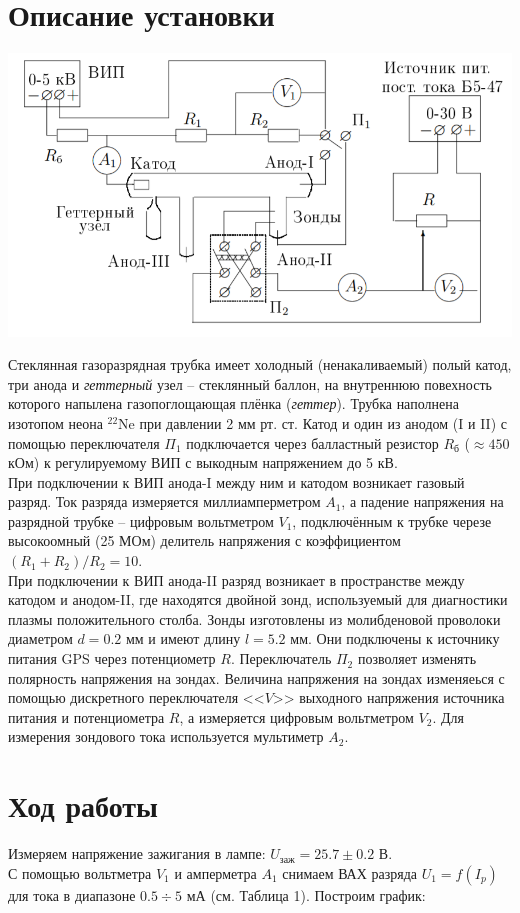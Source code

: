\documentclass[a4paper,12pt]{article}
\begin{document}
\section*{Описание установки}
\begin{center}
\includegraphics[scale=0.6]{1.png}
\end{center}
Стеклянная газоразрядная трубка имеет холодный (ненакаливаемый) полый катод, три анода и \textit{геттерный} узел -- стеклянный баллон, на внутреннюю повехность которого напылена газопоглощающая плёнка (\textit{геттер}). Трубка наполнена изотопом неона $^22$Ne при давлении 2 мм рт. ст. Катод и один из анодом (I и II) с помощью переключателя $\Pi_1$ подключается через балластный резистор $R_\text{б}$ ($\approx 450$ кОм) к регулируемому ВИП с выкодным напряжением до 5 кВ.\\
При подключении к ВИП анода-I между ним и катодом возникает газовый разряд. Ток разряда измеряется миллиамперметром $A_1$, а падение напряжения на разрядной трубке -- цифровым вольтметром $V_1$, подключённым к трубке черезе высокоомный (25 МОм) делитель напряжения с коэффициентом $(R_1+R_2)/R_2 = 10$.\\
При подключении к ВИП анода-II разряд возникает в пространстве между катодом и анодом-II, где находятся двойной зонд, используемый для диагностики плазмы положительного столба. Зонды изготовлены из молибденовой проволоки диаметром $d = 0.2$ мм и имеют длину $l = 5.2$ мм. Они подключены к источнику питания GPS через потенциометр $R$. Переключатель $\Pi_2$ позволяет изменять полярность напряжения на зондах. Величина напряжения на зондах изменяеься с помощью дискретного переключателя <<$V$>> выходного напряжения источника питания и потенциометра $R$, а измеряется цифровым вольтметром $V_2$. Для измерения зондового тока используется мультиметр $A_2$.
\section*{Ход работы}
Измеряем напряжение зажигания в лампе: $U_{\text{заж}} = 25.7\pm 0.2$ В.\\
С помощью вольтметра $V_1$ и амперметра $A_1$ снимаем ВАХ разряда $U_1=f(I_p)$ для тока в диапазоне $0.5 \div 5$ мА (см. Таблица 1).
Построим график:\\
\end{document}
